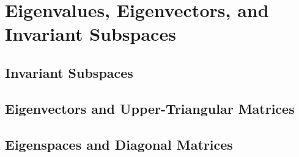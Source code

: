 \chapter{Eigenvalues, Eigenvectors, and Invariant Subspaces}

\section{\label{5.A} Invariant Subspaces}

\section{\label{5.B} Eigenvectors and Upper-Triangular Matrices}

\section{\label{5.C} Eigenspaces and Diagonal Matrices}
